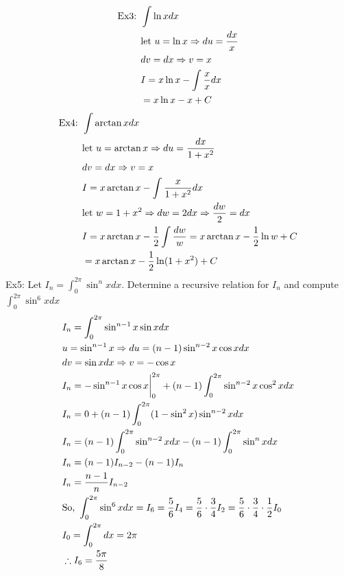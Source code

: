 \documentclass[11pt, fleqn]{article}
\begin{document}
\begin{align*}
    \text{Ex3: }&\int \ln xdx\\
    &\text{let }u=\ln x\Rightarrow du=\frac{dx}{x}\\
    &dv=dx\Rightarrow v=x\\
    &I=x\ln x-\int \frac{x}{x}dx\\
    &=x\ln x-x+C
\end{align*}
\begin{align*}
    \text{Ex4: }&\int \arctan xdx\\
    &\text{let }u=\arctan x\Rightarrow du=\frac{dx}{1+x^2}\\
    &dv=dx\Rightarrow v=x\\
    &I=x\arctan x-\int\frac{x}{1+x^2}dx\\
    &\text{let }w=1+x^2\Rightarrow dw=2dx\Rightarrow \frac{dw}{2}=dx\\
    &I=x\arctan x-\frac{1}{2}\int\frac{dw}{w}=x\arctan x-\frac{1}{2}\ln w+C\\
    &=x\arctan x-\frac{1}{2}\ln(1+x^2)+C
\end{align*}
Ex5: Let $I_n=\int_0^{2\pi}\sin^n xdx$. Determine a recursive relation for $I_n$ and compute $\int_0^{2\pi}\sin^6xdx$
\begin{align*}
    &I_n=\int_0^{2\pi}\sin^{n-1}x\sin xdx\\
    &u=\sin^{n-1}x\Rightarrow du=(n-1)\sin^{n-2}x\cos x dx\\
    &dv=\sin xdx\Rightarrow v=-\cos x\\
    &I_n={-\sin^{n-1}x\cos x}\bigg\vert_0^{2\pi}+(n-1)\int_0^{2\pi}\sin^{n-2}x\cos^2xdx\\
    &I_n=0+(n-1)\int_0^{2\pi}(1-\sin^2x)\sin^{n-2}xdx\\
    &I_n=(n-1)\int_0^{2\pi}\sin^{n-2}xdx-(n-1)\int_0^{2\pi}\sin^nxdx\\
    &I_n=(n-1)I_{n-2}-(n-1)I_n\\
    &I_n=\frac{n-1}{n}I_{n-2}\\
    &\text{So, }\int_0^{2\pi}\sin^6xdx=I_6=\frac{5}{6}I_4=\frac{5}{6}\cdot\frac{3}{4}I_2=\frac{5}{6}\cdot \frac{3}{4}\cdot\frac{1}{2}I_0\\
    &I_0=\int_0^{2\pi}dx=2\pi\\
    &\therefore I_6=\frac{5\pi}{8}
\end{align*}
\end{document}
